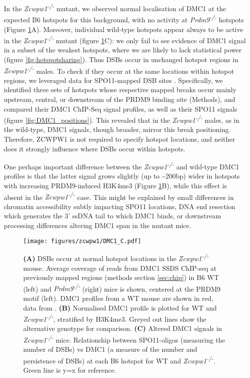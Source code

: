In the \textit{Zcwpw1\textsuperscript{-/-}} mutant, we observed normal localisation of DMC1 at the expected B6 hotspots for this background, with no activity at \textit{Prdm9\textsuperscript{-/-}} hotspots (Figure \ref{fig:DMC1_SSDS}A). Moreover, individual wild-type hotspots appear always to be active in the \textit{Zcwpw1\textsuperscript{-/-}} mutant (figure \ref{fig:DMC1_SSDS}C): we only fail to see evidence of DMC1 signal in a subset of the weakest hotspots, where we are likely to lack statistical power (figure \ref{fig:hotspotsharing}). Thus DSBs occur in unchanged hotspot regions in \textit{Zcwpw1\textsuperscript{-/-}} males. To check if they occur at the same locations within hotspot regions, we leveraged data for SPO11-mapped DSB sites \parencite{Lange2016Landscape}. Specifically, we identified three sets of hotspots whose respective mapped breaks occur mainly upstream, central, or downstream of the PRDM9 binding site (Methods), and compared their DMC1 ChIP-Seq signal profiles, as well as their SPO11 signals (figure \ref{fig:DMC1_positions}). This revealed that in the \textit{Zcwpw1\textsuperscript{-/-}} males, as in the wild-type, DMC1 signals, though broader, mirror this break positioning. Therefore, ZCWPW1 is not required to specify hotspot locations, and neither does it strongly influence where DSBs occur within hotspots. 

One perhaps important difference between the \textit{Zcwpw1\textsuperscript{-/-}} and wild-type DMC1 profiles is that the latter signal grows slightly (up to \textasciitilde200bp) wider in hotspots with increasing PRDM9-induced H3K4me3 (Figure \ref{fig:DMC1_SSDS}B), while this effect is absent in the \textit{Zcwpw1\textsuperscript{-/-}} case. This might be explained by small differences in chromatin accessibility subtly impacting SPO11 locations, DNA end resection which generates the 3’ ssDNA tail to which DMC1 binds, or downstream processing differences altering DMC1 span in the mutant mice. 

\begin{figure}[H]
	\centering
	\texttt{[image: figures/zcwpw1/DMC1\_C.pdf]}
	\caption[DMC1 SSDS ChIPseq]{
		\textbf{(A)} DSBs occur at normal hotspot locations in the \textit{Zcwpw1\textsuperscript{-/-}} mouse. Average coverage of reads from DMC1 SSDS ChIP-seq at previously mapped regions (methods section \ref{sec:chip}) in B6 WT (left) and \textit{Prdm9\textsuperscript{-/-}} (right) mice is shown, centered at the PRDM9 motif (left). DMC1 profiles from a WT mouse are shown in red, data from \parencite{Brick2012Genetic}.
		\textbf{(B)} Normalised DMC1 profile is plotted for WT and \textit{Zcwpw1\textsuperscript{-/-}}, stratified by H3K4me3. Greyed out lines show the alternative genotype for comparison.
		\textbf{(C)} Altered DMC1 signals in \textit{Zcwpw1\textsuperscript{-/-}} mice. Relationship between SPO11-oligos (measuring the number of DSBs) vs DMC1 (a measure of the number and persistence of DSBs) at each B6 hotspot for WT and \textit{Zcwpw1\textsuperscript{-/-}}. Green line is y=x for reference.
	}
	\label{fig:DMC1_SSDS}
\end{figure} 

